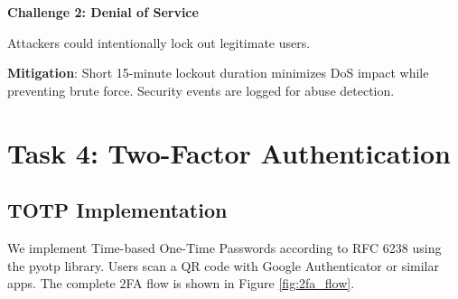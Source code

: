 \documentclass[12pt,a4paper]{article}
\begin{document}
\textbf{Challenge 2: Denial of Service}

Attackers could intentionally lock out legitimate users.

\textbf{Mitigation}: Short 15-minute lockout duration minimizes DoS impact while preventing brute force. Security events are logged for abuse detection.

\section{Task 4: Two-Factor Authentication}

\subsection{TOTP Implementation}

We implement Time-based One-Time Passwords according to RFC 6238 \cite{mraihi2011} using the pyotp library. Users scan a QR code with Google Authenticator or similar apps. The complete 2FA flow is shown in Figure \ref{fig:2fa_flow}.
\end{document}
